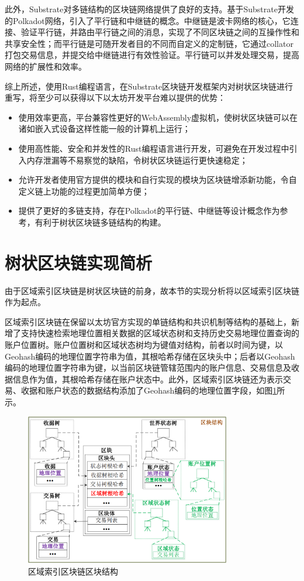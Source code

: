 此外，Substrate对多链结构的区块链网络提供了良好的支持。基于Substrate开发的Polkadot网络，引入了平行链和中继链的概念。中继链是波卡网络的核心，它连接、验证平行链，并路由平行链之间的消息，实现了不同区块链之间的互操作性和共享安全性；而平行链是可随开发者目的不同而自定义的定制链，它通过collator打包交易信息，并提交给中继链进行有效性验证。平行链可以并发处理交易，提高网络的扩展性和效率。

综上所述，使用Rust编程语言，在Substrate区块链开发框架内对树状区块链进行重写，将至少可以获得以下以太坊开发平台难以提供的优势：

\begin{itemize}
    \item 使用效率更高，平台兼容性更好的WebAssembly虚拟机，使树状区块链可以在诸如嵌入式设备这样性能一般的计算机上运行；
    \item 使用高性能、安全和并发性的Rust编程语言进行开发，可避免在开发过程中引入内存泄漏等不易察觉的缺陷，令树状区块链运行更快速稳定；
    \item 允许开发者使用官方提供的模块和自行实现的模块为区块链增添新功能，令自定义链上功能的过程更加简单方便；
    \item 提供了更好的多链支持，存在Polkadot的平行链、中继链等设计概念作为参考，有利于树状区块链多链结构的构建。
\end{itemize}

\section{树状区块链实现简析}

由于区域索引区块链是树状区块链的前身，故本节的实现分析将以区域索引区块链作为起点。

区域索引区块链在保留以太坊官方实现的单链结构和共识机制等结构的基础上，新增了支持快速检索地理位置相关数据的区域状态树和支持历史交易地理位置查询的账户位置树。账户位置树和区域状态树均为键值对结构，前者以时间为键，以Geohash编码的地理位置字符串为值，其根哈希存储在区块头中；后者以Geohash编码的地理位置字符串为键，以当前区块链管辖范围内的账户信息、交易信息及收据信息作为值，其根哈希存储在账户状态中。此外，区域索引区块链还为表示交易、收据和账户状态的数据结构添加了Geohash编码的地理位置字段，如图\ref{区域链区块示意图}所示。

\begin{figure}[htbp]
    \centering
    \includegraphics[width=0.8\textwidth]{images/区域链区块示意图.png}
    \caption{区域索引区块链区块结构}\label{区域链区块示意图} %
\end{figure}

